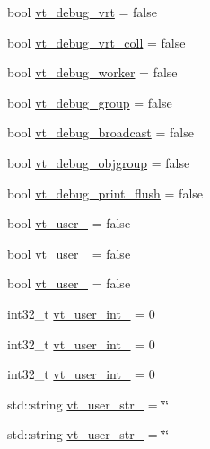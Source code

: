 \begin{DoxyCompactItemize}
\item 
bool \hyperlink{structvt_1_1arguments_1_1_app_config_abf36f4e4495886dd28881f6a53bb6ef8}{vt\+\_\+debug\+\_\+vrt} = false
\item 
bool \hyperlink{structvt_1_1arguments_1_1_app_config_a2fa9d02b2b24fcd84fe34929a2028f03}{vt\+\_\+debug\+\_\+vrt\+\_\+coll} = false
\item 
bool \hyperlink{structvt_1_1arguments_1_1_app_config_a5344521890716c49c4987d33a4ce4768}{vt\+\_\+debug\+\_\+worker} = false
\item 
bool \hyperlink{structvt_1_1arguments_1_1_app_config_abd2c68a17654a8fccd5b00cbee985d10}{vt\+\_\+debug\+\_\+group} = false
\item 
bool \hyperlink{structvt_1_1arguments_1_1_app_config_a645d1d8715b23cf25e10fdfac2b1f742}{vt\+\_\+debug\+\_\+broadcast} = false
\item 
bool \hyperlink{structvt_1_1arguments_1_1_app_config_a0ace9e3c5a86d8803efc5ca0ff19182e}{vt\+\_\+debug\+\_\+objgroup} = false
\item 
bool \hyperlink{structvt_1_1arguments_1_1_app_config_a70b42078203d8487af0217f18cd146d3}{vt\+\_\+debug\+\_\+print\+\_\+flush} = false
\item 
bool \hyperlink{structvt_1_1arguments_1_1_app_config_aaa6899e13338268d18fde3e98673fb91}{vt\+\_\+user\+\_} = false
\item 
bool \hyperlink{structvt_1_1arguments_1_1_app_config_a87b18825cd9cf3375087292642ecd5eb}{vt\+\_\+user\+\_} = false
\item 
bool \hyperlink{structvt_1_1arguments_1_1_app_config_a5c382e231e5876b32efeced0851a6e91}{vt\+\_\+user\+\_} = false
\item 
int32\+\_\+t \hyperlink{structvt_1_1arguments_1_1_app_config_a67743c94695b1827b560e767ce3ad8c9}{vt\+\_\+user\+\_\+int\+\_} = 0
\item 
int32\+\_\+t \hyperlink{structvt_1_1arguments_1_1_app_config_abcb595a7f5fb7f7bdd97a6ae0bda65d0}{vt\+\_\+user\+\_\+int\+\_} = 0
\item 
int32\+\_\+t \hyperlink{structvt_1_1arguments_1_1_app_config_a8f38ef40f1da0f23f36af5c243ae8307}{vt\+\_\+user\+\_\+int\+\_} = 0
\item 
std\+::string \hyperlink{structvt_1_1arguments_1_1_app_config_a82c297d0e47d184d31e1995bd4875679}{vt\+\_\+user\+\_\+str\+\_} = \char`\"{}\char`\"{}
\item 
std\+::string \hyperlink{structvt_1_1arguments_1_1_app_config_ae32089b77ac32131a690657847c7e194}{vt\+\_\+user\+\_\+str\+\_} = \char`\"{}\char`\"{}

\end{DoxyCompactItemize}
